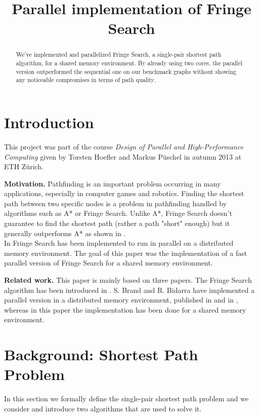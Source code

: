 \documentclass[letterpaper]{article}
\title{Parallel implementation of Fringe Search}
\newcommand{\mypar}[1]{{\bf #1.}}
\begin{document}
%
\maketitle
%

\begin{abstract}
We've implemented and parallelized Fringe Search, a single-pair shortest path algorithm, for a shared memory environment. By already using two cores, the parallel version outperformed the sequential one on our benchmark graphs without showing any noticeable compromises in terms of path quality.
\end{abstract}

\section{Introduction}\label{sec:intro}

This project was part of the course \textit{Design of Parallel and High-Performance Computing} given by Torsten Hoefler and Markus Püschel in autumn 2013 at ETH Zürich.


\mypar{Motivation} 
Pathfinding is an important problem occurring in many applications, especially in computer games and robotics. Finding the shortest path between two specific nodes is a problem in pathfinding handled by algorithms such as A* or Fringe Search. Unlike A*, Fringe Search doesn't guarantee to find the shortest path (rather a path "short" enough) but it generally outperforms A* as shown in \cite{fringe:05}.\\
In \cite{brand:09} Fringe Search has been implemented to run in parallel on a distributed memory environment. The goal of this paper was the implementation of a fast parallel version of Fringe Search for a shared memory environment.

\mypar{Related work} This paper is mainly based on three papers. The Fringe Search algorithm has been introduced in \cite{fringe:05}. S. Brand and R. Bidarra have implemented a parallel version in a distributed memory environment, published in \cite{brand:09} and in \cite{brand:12}, whereas in this paper the implementation has been done for a shared memory environment.

\section{Background: Shortest Path Problem}\label{sec:background}
In this section we formally define the single-pair shortest path problem and we consider and introduce two algorithms that are used to solve it.
\end{document}
